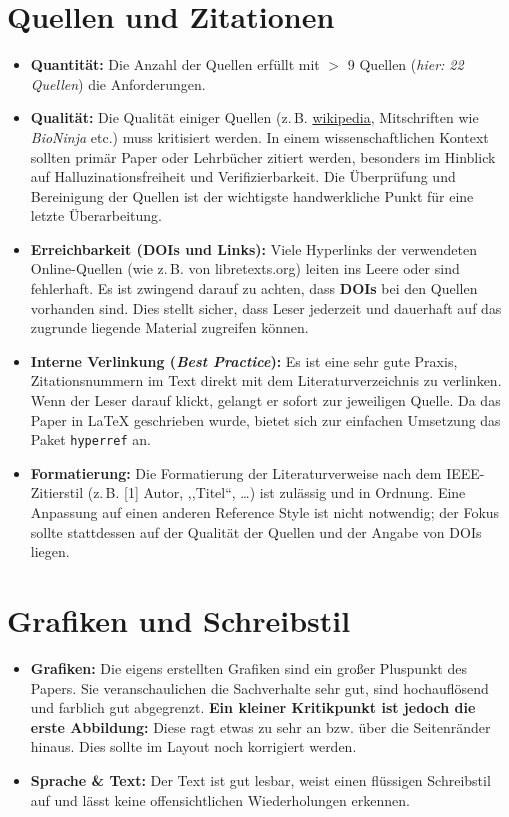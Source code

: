 ﻿\documentclass[11pt, a4paper, ngerman]{article}
\begin{document}
\section{Quellen und Zitationen}
\begin{itemize}
    \item \textbf{Quantität:} Die Anzahl der Quellen erfüllt mit $>$ 9 Quellen (\textit{hier: 22 Quellen}) die Anforderungen.
    \item \textbf{Qualität:} Die Qualität einiger Quellen (z.\,B. \url{wikipedia}, Mitschriften wie \textit{BioNinja} etc.) muss kritisiert werden. In einem wissenschaftlichen Kontext sollten primär Paper oder Lehrbücher zitiert werden, besonders im Hinblick auf Halluzinationsfreiheit und Verifizierbarkeit. Die Überprüfung und Bereinigung der Quellen ist der wichtigste handwerkliche Punkt für eine letzte Überarbeitung.
    \item \textbf{Erreichbarkeit (DOIs und Links):} Viele Hyperlinks der verwendeten Online-Quellen (wie z.\,B. von libretexts.org) leiten ins Leere oder sind fehlerhaft. Es ist zwingend darauf zu achten, dass \textbf{DOIs} bei den Quellen vorhanden sind. Dies stellt sicher, dass Leser jederzeit und dauerhaft auf das zugrunde liegende Material zugreifen können.
    \item \textbf{Interne Verlinkung (\textit{Best Practice}):} Es ist eine sehr gute Praxis, Zitationsnummern im Text direkt mit dem Literaturverzeichnis zu verlinken. Wenn der Leser darauf klickt, gelangt er sofort zur jeweiligen Quelle. Da das Paper in LaTeX geschrieben wurde, bietet sich zur einfachen Umsetzung das Paket \texttt{hyperref} an.
    \item \textbf{Formatierung:} Die Formatierung der Literaturverweise nach dem IEEE-Zitierstil (z.\,B. [1] Autor, ,,Titel``, \dots) ist zulässig und in Ordnung. Eine Anpassung auf einen anderen Reference Style ist nicht notwendig; der Fokus sollte stattdessen auf der Qualität der Quellen und der Angabe von DOIs liegen.
\end{itemize}

\section{Grafiken und Schreibstil}
\begin{itemize}
    \item \textbf{Grafiken:} Die eigens erstellten Grafiken sind ein großer Pluspunkt des Papers. Sie veranschaulichen die Sachverhalte sehr gut, sind hochauflösend und farblich gut abgegrenzt. \textbf{Ein kleiner Kritikpunkt ist jedoch die erste Abbildung:} Diese ragt etwas zu sehr an bzw. über die Seitenränder hinaus. Dies sollte im Layout noch korrigiert werden.
    \item \textbf{Sprache \& Text:} Der Text ist gut lesbar, weist einen flüssigen Schreibstil auf und lässt keine offensichtlichen Wiederholungen erkennen.
\end{itemize}
\end{document}
